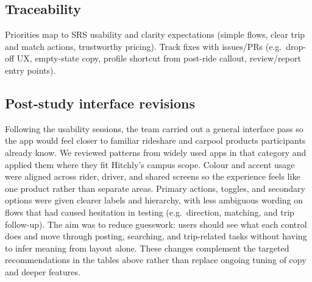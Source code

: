 \subsection{Traceability}

Priorities map to SRS usability and clarity expectations (simple flows, clear trip and match actions, trustworthy pricing). Track fixes with issues/PRs (e.g.\ drop-off UX, empty-state copy, profile shortcut from post-ride callout, review/report entry points).

\subsection{Post-study interface revisions}

Following the usability sessions, the team carried out a general interface pass so the app would feel closer to familiar rideshare and carpool products participants already know. We reviewed patterns from widely used apps in that category and applied them where they fit Hitchly's campus scope. Colour and accent usage were aligned across rider, driver, and shared screens so the experience feels like one product rather than separate areas. Primary actions, toggles, and secondary options were given clearer labels and hierarchy, with less ambiguous wording on flows that had caused hesitation in testing (e.g.\ direction, matching, and trip follow-up). The aim was to reduce guesswork: users should see what each control does and move through posting, searching, and trip-related tasks without having to infer meaning from layout alone. These changes complement the targeted recommendations in the tables above rather than replace ongoing tuning of copy and deeper features.
